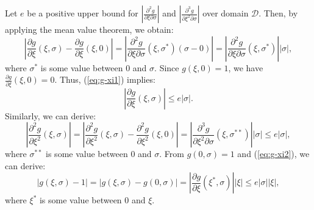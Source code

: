 \documentclass[12pt]{article}
\begin{document}
Let $e$ be a positive upper bound for 
$\left| \frac{\partial^2 g}{\partial \xi \partial \sigma} \right|$ and
$\left| \frac{\partial^3 g}{\partial \xi^2 \partial \sigma} \right|$ over domain $\mathcal{D}$. 
Then, by applying the mean value theorem, we obtain:  
\begin{equation}\label{eq:g-xi1}
\left| \frac{\partial g}{\partial \xi} (\xi, \sigma) - \frac{\partial g}{\partial \xi} (\xi, 0) \right| 
= \left| \frac{\partial^2 g}{\partial \xi \partial \sigma}(\xi,\sigma^*) (\sigma - 0) \right| 
= \left| \frac{\partial^2 g}{\partial \xi \partial \sigma}(\xi,\sigma^*)\right|\left|\sigma \right|,
\end{equation}
where $\sigma^*$ is some value between $0$ and $\sigma$.
Since $g(\xi, 0) = 1$, we have $\frac{\partial g}{\partial \xi} (\xi, 0) = 0$. 
Thus, (\ref{eq:g-xi1}) implies:
\begin{equation}\label{eq:g-xi2}
\left| \frac{\partial g}{\partial \xi}(\xi, \sigma) \right| \leq e \left| \sigma \right|.
\end{equation}
Similarly, we can derive:
\begin{equation}\label{eq:g-xi3}
\left| \frac{\partial^2 g}{\partial \xi^2 } (\xi, \sigma) \right| 
= \left| \frac{\partial^2 g}{\partial \xi^2} (\xi, \sigma) - \frac{\partial^2 g}{\partial \xi^2} (\xi, 0) \right| 
= \left| \frac{\partial^3 g}{\partial \xi^2 \partial \sigma}(\xi,\sigma^{**})\right|\left|\sigma \right| 
\leq e \left| \sigma \right|,
\end{equation}
where $\sigma^{**}$ is some value between $0$ and $\sigma$.
From $g(0, \sigma) = 1$ and  (\ref{eq:g-xi2}), we can derive: 
\begin{equation}\label{eq:g-xi4}
\left| g(\xi, \sigma) - 1 \right|  
= \left| g(\xi, \sigma) - g(0, \sigma) \right| 
= \left| \frac{\partial g}{\partial \xi} (\xi^*, \sigma) \right| \left| \xi \right| 
\leq e \left| \sigma \right| \left| \xi \right|,
\end{equation}
where $\xi^*$ is some value between $0$ and $\xi$.
\end{document}
